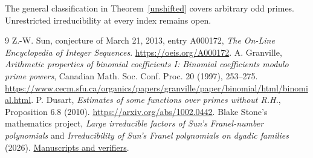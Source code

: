 \documentclass[11pt]{article}
\begin{document}
The general classification in Theorem~\ref{unshifted} covers arbitrary odd primes. Unrestricted irreducibility at every index remains open.
\begin{thebibliography}{9}
 Z.-W. Sun, conjecture of March 21, 2013, entry A000172, \emph{The On-Line Encyclopedia of Integer Sequences}. \url{https://oeis.org/A000172}.
 A. Granville, \emph{Arithmetic properties of binomial coefficients I: Binomial coefficients modulo prime powers}, Canadian Math. Soc. Conf. Proc. 20 (1997), 253--275. \url{https://www.cecm.sfu.ca/organics/papers/granville/paper/binomial/html/binomial.html}.
 P. Dusart, \emph{Estimates of some functions over primes without R.H.}, Proposition 6.8 (2010). \url{https://arxiv.org/abs/1002.0442}.
 Blake Stone's mathematics project, \emph{Large irreducible factors of Sun's Franel-number polynomials} and \emph{Irreducibility of Sun's Franel polynomials on dyadic families} (2026). \href{https://github.com/blakestone-x/math/tree/5a9d2730dd28ae3031c488960ae2f6cd08a36803/A000172}{Manuscripts and verifiers}.
\end{thebibliography}
\end{document}
